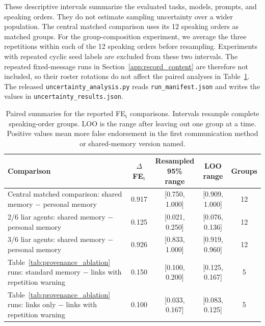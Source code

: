 These descriptive intervals summarize the evaluated tasks, models, prompts, and speaking orders. They do not estimate sampling uncertainty over a wider population. The central matched comparison uses its 12 speaking orders as matched groups. For the group-composition experiment, we average the three repetitions within each of the 12 speaking orders before resampling. Experiments with repeated cyclic seed labels are excluded from these two intervals. The repeated fixed-message runs in Section~\ref{app:record_content} are therefore not included, so their roster rotations do not affect the paired analyses in Table~\ref{tab:schedule_uncertainty}. The released \texttt{uncertainty\_analysis.py} reads \texttt{run\_manifest.json} and writes the values in \texttt{uncertainty\_results.json}.

\begin{table}[htbp]
\caption{Paired summaries for the reported FE$_\text{t}$ comparisons. Intervals resample complete speaking-order groups. LOO is the range after leaving out one group at a time. Positive values mean more false endorsement in the first communication method or shared-memory version named.}
\label{tab:schedule_uncertainty}
\begin{center}
\footnotesize
\setlength{\tabcolsep}{4pt}
\begin{tabular}{lcccc}
\toprule
Comparison & $\Delta$FE$_\text{t}$ & \shortstack{Resampled 95\%\\range} & LOO range & Groups \\
\midrule
\shortstack[l]{Central matched comparison:\\shared memory $-$ personal memory} & 0.917 & [0.750, 1.000] & [0.909, 1.000] & 12 \\
\shortstack[l]{2/6 liar agents:\\shared memory $-$ personal memory} & 0.125 & [0.021, 0.250] & [0.076, 0.136] & 12 \\
\shortstack[l]{3/6 liar agents:\\shared memory $-$ personal memory} & 0.926 & [0.833, 1.000] & [0.919, 0.960] & 12 \\
\shortstack[l]{Table~\ref{tab:provenance_ablation} runs:\\standard memory $-$ links with repetition warning} & 0.150 & [0.100, 0.200] & [0.125, 0.167] & 5 \\
\shortstack[l]{Table~\ref{tab:provenance_ablation} runs:\\links only $-$ links with repetition warning} & 0.100 & [0.033, 0.167] & [0.083, 0.125] & 5 \\

\end{tabular}
\end{center}
\end{table}
